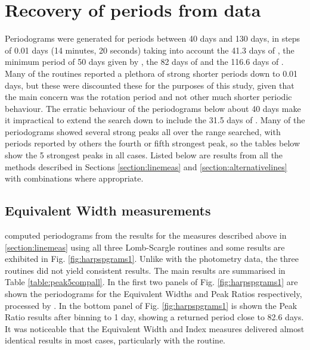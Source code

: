 \section{Recovery of periods from {\harps} data}
\protect\label{section:harpsper}

Periodograms were generated for periods between 40 days and 130 days, in steps of 0.01 days (14 minutes, 20 seconds)
taking into account the 41.3 days of \citet{benedict93}, the minimum period of 50 days given by \citet{kurster99}, the
82 days of \citealt{benedict92,benedict98,kiraga07} and the 116.6 days of \citet[Table 3]{suarezmascareno15}. Many of
the routines reported a plethora of strong shorter periods down to 0.01 days, but these were discounted these for the
purposes of this study, given that the main concern was the rotation period and not other much shorter periodic
behaviour. The erratic behaviour of the periodograms below about 40 days make it impractical to extend the search down
to include the 31.5 days of \citet{guinan96}. Many of the periodograms showed several strong peaks all over the range
searched, with periods reported by others the fourth or fifth strongest peak, so the tables below show the 5 strongest
peaks in all cases. Listed below are results from all the methods described in Sections \ref{section:linemeas} and
\ref{section:alternativelines} with combinations where appropriate.

\subsection{Equivalent Width measurements}
\protect\label{section:ewper}

{\FirstP} computed periodograms from the results for the measures described above in \ref{section:linemeas} using all
three Lomb-Scargle routines and some results are exhibited in Fig. \ref{fig:harpspgrams1}. Unlike with the {\asas}
photometry data, the three routines did not yield consistent results. The main results are summarised in Table
\ref{table:peak5compall}. In the first two panels of Fig. \ref{fig:harpspgrams1} are shown the periodograms for the
Equivalent Widths and Peak Ratios respectively, processed by {\gatspy}. In the bottom panel of
Fig. \ref{fig:harpspgrams1} is shown the Peak Ratio results after binning to 1 day, showing a returned period close to
82.6 days. It was noticeable that the Equivalent Width and {\ha} Index measures delivered almost identical results in
most cases, particularly with the {\gatspy} routine.

